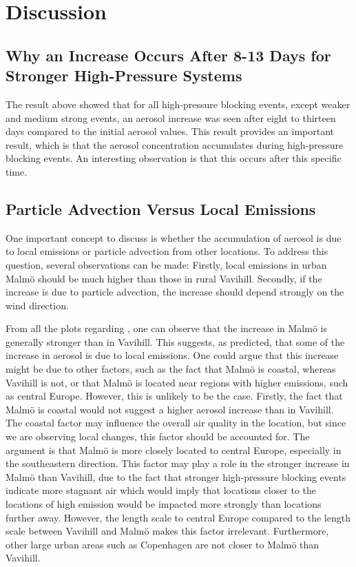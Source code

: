 \newpage
\section{Discussion}
\subsection{Why an Increase Occurs After 8-13 Days for Stronger High-Pressure Systems}
The result above showed that for all high-pressure blocking events, except weaker and medium strong events, an aerosol increase was seen after eight to thirteen days compared to the initial aerosol values. This result provides an important result, which is that the aerosol concentration accumulates during high-pressure blocking events. An interesting observation is that this occurs after this specific time. 

\subsection{Particle Advection Versus Local Emissions}
One important concept to discuss is whether the accumulation of aerosol is due to local emissions or particle advection from other locations. To address this question, several observations can be made: Firstly, local emissions in urban Malmö should be much higher than those in rural Vavihill. Secondly, if the increase is due to particle advection, the increase should depend strongly on the wind direction. 

From all the plots regarding \PM, one can observe that the increase in Malmö is generally stronger than in Vavihill. This suggests, as predicted, that some of the increase in aerosol is due to local emissions. One could argue that this increase might be due to other factors, such as the fact that Malmö is coastal, whereas Vavihill is not, or that Malmö is located near regions with higher emissions, such as central Europe. However, this is unlikely to be the case. Firstly, the fact that Malmö is coastal would not suggest a higher aerosol increase than in Vavihill. The coastal factor may influence the overall air quality in the location, but since we are observing local changes, this factor should be accounted for. The argument is that Malmö is more closely located to central Europe, especially in the southeastern direction. This factor may play a role in the stronger increase in Malmö than Vavihill, due to the fact that stronger high-pressure blocking events indicate more stagnant air which would imply that locations closer to the locations of high emission would be impacted more strongly than locations further away. However, the length scale to central Europe compared to the length scale between Vavihill and Malmö makes this factor irrelevant. Furthermore, other large urban areas such as Copenhagen are not closer to Malmö than Vavihill. 

